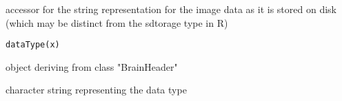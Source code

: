 \begin{Description}\relax
accessor for the string representation for the image data as it is
stored on disk (which may be distinct from the sdtorage type in R)
\end{Description}
\begin{Usage}
\begin{verbatim}
dataType(x)
\end{verbatim}
\end{Usage}
\begin{Arguments}
\begin{ldescription}
\item[\code{x}] object deriving from class "BrainHeader" 
\end{ldescription}
\end{Arguments}
\begin{Value}
character string representing the data type
\end{Value}

